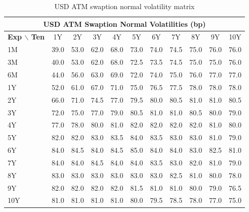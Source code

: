 \documentclass[conference]{IEEEtran}
\begin{document}
\begin{table}[!t]
\centering
\begin{tabular}{l|cccccccccc}
\toprule
\multicolumn{11}{c}{\textbf{USD ATM Swaption Normal Volatilities (bp)}} \\
\midrule
\textbf{Exp $\backslash$ Ten} & 1Y & 2Y & 3Y & 4Y & 5Y & 6Y & 7Y & 8Y & 9Y & 10Y \\
\midrule
1M & 39.0 & 53.0 & 62.0 & 68.0 & 73.0 & 74.0 & 74.5 & 75.0 & 76.0 & 76.0 \\
3M & 40.0 & 53.0 & 62.0 & 68.0 & 72.5 & 73.5 & 74.5 & 75.0 & 75.0 & 76.0 \\
6M & 44.0 & 56.0 & 63.0 & 69.0 & 72.0 & 74.0 & 75.0 & 76.0 & 77.0 & 77.0 \\
1Y & 52.0 & 61.0 & 67.0 & 71.0 & 75.0 & 76.5 & 77.5 & 78.0 & 78.0 & 78.0 \\
2Y & 66.0 & 71.0 & 74.5 & 77.0 & 79.5 & 80.0 & 80.5 & 81.0 & 81.0 & 80.5 \\
3Y & 72.0 & 75.0 & 77.0 & 79.0 & 80.5 & 81.0 & 81.0 & 80.5 & 80.0 & 79.0 \\
4Y & 77.0 & 78.0 & 80.0 & 81.0 & 82.0 & 82.0 & 82.0 & 82.0 & 81.0 & 80.0 \\
5Y & 82.0 & 82.0 & 83.0 & 83.5 & 84.0 & 83.5 & 83.0 & 83.0 & 81.0 & 79.0 \\
6Y & 84.0 & 84.5 & 84.0 & 84.5 & 85.0 & 84.0 & 84.0 & 83.0 & 82.5 & 81.0 \\
7Y & 84.0 & 84.0 & 84.5 & 84.0 & 84.0 & 83.5 & 83.0 & 82.0 & 81.0 & 79.0 \\
8Y & 83.0 & 83.0 & 83.0 & 83.0 & 83.0 & 83.0 & 82.5 & 81.0 & 80.0 & 78.0 \\
9Y & 82.0 & 82.0 & 82.0 & 82.0 & 81.5 & 81.0 & 81.0 & 80.0 & 79.0 & 76.5 \\
10Y & 81.0 & 81.0 & 81.0 & 81.0 & 80.0 & 79.5 & 78.5 & 78.0 & 77.0 & 75.0 \\
\bottomrule
\end{tabular}
\caption{USD ATM swaption normal volatility matrix}
\end{table}
\end{document}
